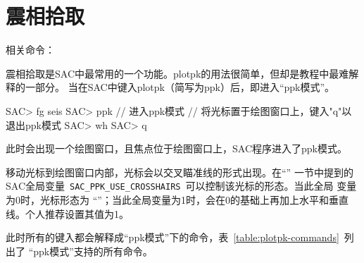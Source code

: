 \section{震相拾取}
\label{sec:phase-picking}

相关命令：

震相拾取是SAC中最常用的一个功能。plotpk的用法很简单，但却是教程中最难解释的一部分。
当在SAC中键入plotpk（简写为ppk）后，即进入``ppk模式''。

\begin{SACCode}
SAC> fg seis
SAC> ppk        // 进入ppk模式
// 将光标置于绘图窗口上，键入"q"以退出ppk模式
SAC> wh
SAC> q
\end{SACCode}
此时会出现一个绘图窗口，且焦点位于绘图窗口上，SAC程序进入了ppk模式。

移动光标到绘图窗口内部，光标会以交叉瞄准线的形式出现。在``''
一节中提到的SAC全局变量~\verb+SAC_PPK_USE_CROSSHAIRS+~可以控制该光标的形态。当此全局
变量为0时，光标形态为
``''；当此全局变量为1时，会在0的基础上再加上水平和垂直线。个人推荐设置其值为1。

此时所有的键入都会解释成``ppk模式''下的命令，表~\ref{table:plotpk-commands}~列出了
``ppk模式''支持的所有命令。

